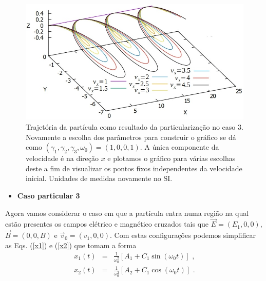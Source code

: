 \documentclass[twocolumn]{rbef}
\newcommand{\1}{\mathbbm{1}}
\begin{document}
\begin{figure}[!htb]
  \centering \includegraphics[scale=0.4]{Graph1.jpg}
  \caption{Trajetória da partícula como resultado da particularização no
    caso 3. Novamente a escolha dos parâmetros para construir o gráfico
    se dá como $(\gamma_1,\gamma_2,\gamma_3,\omega_0)=(1,0,0,1)$. A
    única componente da velocidade é na direção $x$ e plotamos o gráfico
    para várias escolhas deste a fim de visualizar os pontos fixos
    independentes da velocidade inicial. Unidades de medidas novamente
    no SI.}
  \label{Graph1}
\end{figure}

\begin{itemize}
\item \textbf{Caso particular 3}
\end{itemize}

Agora vamos considerar o caso em que a partícula entra numa região na
qual estão presentes os campos elétrico e magnético cruzados tais que
$\vec{E}=(E_{1},0,0)$, $\vec{B}=(0,0,B)$ e
$\vec{v}_{0}=(v_{1},0,0)$. Com estas configurações podemos simplificar
as Eqs. (\ref{x1}) e (\ref{x2}) que tomam a forma
\begin{eqnarray}
  x_{1}\left( t\right)  &=&\frac{1}{\omega_{0} ^{2}}\left[ A_{1} +C_{1}\sin \left( \omega_{0} t\right) \right] \label{cx} \text{ ,}  \\
  x_{2}\left( t\right)  &=&\frac{1}{\omega_{0} ^{2}}\left[ A_{2}+C_{1}\cos \left(
                            \omega_{0} t\right) \right]  \text{ .} \label{cy}
\end{eqnarray}%
\end{document}
